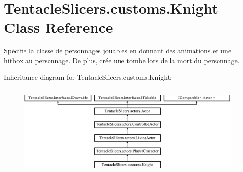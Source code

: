 \hypertarget{class_tentacle_slicers_1_1customs_1_1_knight}{}\section{Tentacle\+Slicers.\+customs.\+Knight Class Reference}
\label{class_tentacle_slicers_1_1customs_1_1_knight}


Spécifie la classe de personnages jouables en donnant des animations et une hitbox au personnage. De plus, crée une tombe lors de la mort du personnage.  


Inheritance diagram for Tentacle\+Slicers.\+customs.\+Knight\+:\begin{figure}[H]
\begin{center}
\leavevmode
\includegraphics[height=4.590164cm]{class_tentacle_slicers_1_1customs_1_1_knight}
\end{center}
\end{figure}
